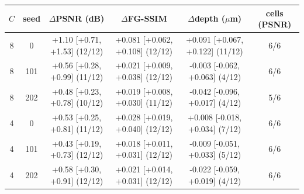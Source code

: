 \begin{tabular}{@{}cc ccc c@{}}\toprule
$C$ & seed & $\Delta$PSNR (dB) & $\Delta$FG-SSIM & $\Delta$depth ($\mu$m) & cells (PSNR)\\\midrule
8 & 0 & +1.10 [+0.71, +1.53] (12/12) & +0.081 [+0.062, +0.108] (12/12) & +0.091 [+0.067, +0.122] (11/12) & 6/6\\
8 & 101 & +0.56 [+0.28, +0.99] (11/12) & +0.021 [+0.009, +0.038] (12/12) & -0.003 [-0.062, +0.063] (4/12) & 6/6\\
8 & 202 & +0.48 [+0.23, +0.78] (10/12) & +0.019 [+0.008, +0.030] (11/12) & -0.042 [-0.096, +0.017] (4/12) & 5/6\\
4 & 0 & +0.53 [+0.25, +0.81] (11/12) & +0.028 [+0.019, +0.040] (12/12) & +0.008 [-0.018, +0.034] (7/12) & 6/6\\
4 & 101 & +0.43 [+0.19, +0.73] (12/12) & +0.018 [+0.011, +0.031] (12/12) & -0.009 [-0.051, +0.033] (5/12) & 6/6\\
4 & 202 & +0.58 [+0.30, +0.91] (12/12) & +0.021 [+0.014, +0.031] (12/12) & -0.022 [-0.059, +0.019] (4/12) & 6/6\\
\bottomrule\end{tabular}
